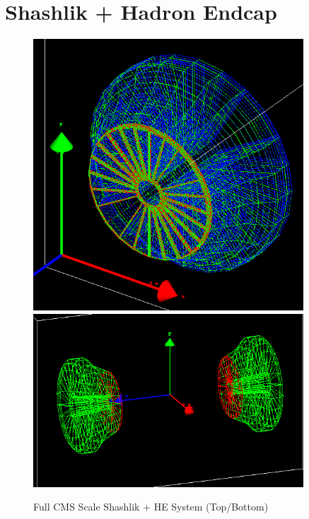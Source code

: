 \section{Shashlik + Hadron Endcap} \label{section:simulations_shashlik}

\begin{figure}[hbp]
    \centering
    \includegraphics[width=0.9\textwidth]{figures/ch_simulations/shashlik/geometry/Shashlik+HE_Complete_Wire.png}
    \includegraphics[width=0.9\textwidth]{figures/ch_simulations/shashlik/geometry/SHE_70_20.png}
    \caption{Full CMS Scale Shashlik + HE System (Top/Bottom)}
    \label{fig:higgs_simulations_shashlikexamples}
 \end{figure}

